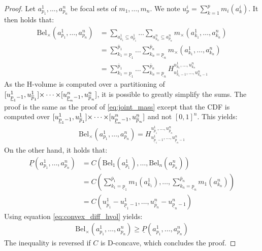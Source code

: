 \begin{proof}
    Let $a^1_{p_1},\dots,a^n_{p_n}$ be focal sets of $m_1,\dots,m_n$. We note $u^i_p=\sum_{k=1}^p m_i(a^i_k)$. It then holds that:
    \begin{align*}
        \mathrm{Bel}_\times(a^1_{p_1}, \dots, a^n_{p_n}) &= \sum_{a^1_{k_1}\subseteq a^1_{p_1}}\dots\sum_{a^n_{k_n}\subseteq a^n_{p_n}}m_\times(a^1_{k_1},\dots, a^n_{k_n})\\
        &= \sum_{k_1=\underline{p}_1}^{\overline{p}_1}\dots\sum_{k_n=\underline{p}_n}^{\overline{p}_n}m_\times(a^1_{k_1},\dots, a^n_{k_n})\\
        &= \sum_{k_1=\underline{p}_1}^{\overline{p}_1}\dots\sum_{k_n=\underline{p}_n}^{\overline{p}_n}H_{u^1_{k_1-1},\dots,u^n_{k_n-1}}^{u^1_{k_1},\dots,u^n_{k_n}}
    \end{align*}
    As the H-volume is computed over a partitioning of $[u^1_{\underline{p}_1-1}, u^1_{\overline{p}_1}]{\times\dots\times}[u^n_{\underline{p}_n-1} , u^n_{\overline{p}_n}]$, it is possible to greatly simplify the sums. The proof is the same as the proof of \eqref{eq:joint_mass} except that the CDF is computed over $[u^1_{\underline{p}_1-1}, u^1_{\overline{p}_1}]{\times\dots\times}[u^n_{\underline{p}_n-1} , u^n_{\overline{p}_n}]$ and not $[0,1]^n$. This yields:
    \begin{align*}
        \mathrm{Bel}_\times(a^1_{p_1}, \dots, a^n_{p_n}) = H_{u^1_{\underline{p}_1-1},\dots,u^n_{\underline{p}_n-1}}^{u^1_{\overline{p}_1},\dots,u^n_{\overline{p}_n}}
    \end{align*}
    On the other hand, it holds that:
    \begin{align*}
        \underline{P}(a^1_{p_1}, \dots, a^n_{p_n}) &= C(\mathrm{Bel}_1(a^1_{p_1}),\dots,\mathrm{Bel}_n(a^n_{p_n}))\\
        &= C(\sum_{k_1=\underline{p}_1}^{\overline{p}_1} m_1(a^1_{k_1}), \dots, \sum_{k_n=\underline{p}_n}^{\overline{p}_n} m_1(a^n_{k_n}))\\
        &= C(u^1_{\overline{p}_1} - u^1_{\underline{p}_1-1}, \dots, u^n_{\overline{p}_n} - u^n_{\underline{p}_n-1})
    \end{align*}
    Using equation \eqref{eq:convex_diff_hvol} yields:
    \begin{align*}
        \mathrm{Bel}_\times(a^1_{p_1}, \dots, a^n_{p_n}) \geqslant \underline{P}(a^1_{p_1}, \dots, a^n_{p_n})
    \end{align*}
    The inequality is reversed if $C$ is D-concave, which concludes the proof.
\end{proof}

